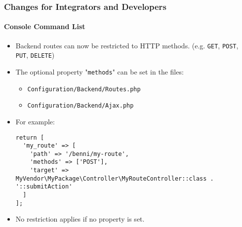 %

\begin{frame}[fragile]
	\frametitle{Changes for Integrators and Developers}
	\framesubtitle{Console Command List}


	\begin{itemize}
		\item Backend routes can now be restricted to HTTP methods.\newline
			\small(e.g. \texttt{GET}, \texttt{POST}, \texttt{PUT}, \texttt{DELETE})
		\item The optional property "\texttt{methods}" can be set in the files:
			\begin{itemize}\smaller
				\item \texttt{Configuration/Backend/Routes.php}
				\item \texttt{Configuration/Backend/Ajax.php}
			\end{itemize}
			\vspace{0.2cm}
		\item For example:
\begin{lstlisting}
return [
  'my_route' => [
    'path' => '/benni/my-route',
    'methods' => ['POST'],
    'target' => MyVendor\MyPackage\Controller\MyRouteController::class . '::submitAction'
  ]
];
\end{lstlisting}

		\item No restriction applies if no property is set.

	\end{itemize}

\end{frame}

